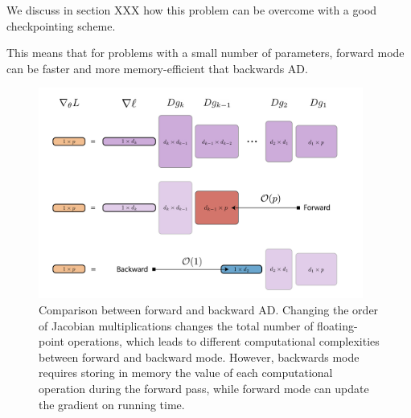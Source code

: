 We discuss in section XXX how this problem can be overcome with a good checkpointing scheme. 

This means that for problems with a small number of parameters, forward mode can be faster and more memory-efficient that backwards AD.

\begin{figure}[t]
    \centering
    \includegraphics[width=0.95\textwidth]{figures/VJP-JVP.png}
    \caption{Comparison between forward and backward AD. Changing the order of Jacobian multiplications changes the total number of floating-point operations, which leads to different computational complexities between forward and backward mode. However, backwards mode requires storing in memory the value of each computational operation during the forward pass, while forward mode can update the gradient on running time.}
    \label{fig:vjp-jvp}
\end{figure}
